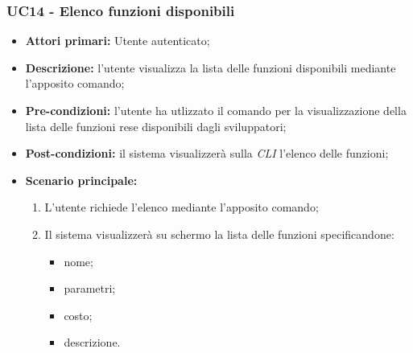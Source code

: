 \subsubsection{UC14 - Elenco funzioni disponibili}
\begin{itemize}
	\item \textbf{Attori primari:} Utente autenticato;
	\item \textbf{Descrizione:} l'utente visualizza la lista delle funzioni disponibili mediante l'apposito comando; 
	\item \textbf{Pre-condizioni:} l'utente ha utlizzato il comando per la visualizzazione della lista delle funzioni rese disponibili dagli sviluppatori;
	\item \textbf{Post-condizioni:} il sistema visualizzerà sulla \textit{CLI\glo} l'elenco delle funzioni;
	\item \textbf{Scenario principale:} 
	\begin{enumerate}
		\item L'utente richiede l'elenco mediante l'apposito comando;
		\item Il sistema visualizzerà su schermo la lista delle funzioni specificandone:
		\begin{itemize}
			\item nome;
			\item parametri;
			\item costo;
			\item descrizione.
		\end{itemize}
	\end{enumerate}
\end{itemize}